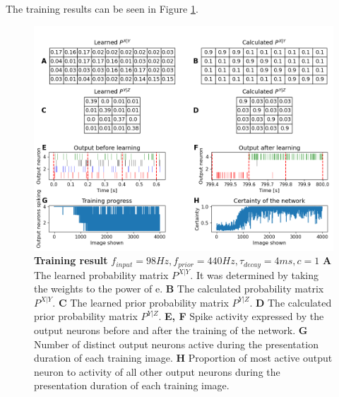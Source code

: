 The training results can be seen in Figure \ref{fig:1DTraining}. 
\begin{figure}
  \includegraphics[width=\linewidth]{figures/1D/training/trainingPlot_98_440_4.png}
  \caption{\textbf{Training result} $f_{input} = 98 Hz, f_{prior} = 440 Hz, \tau_{decay} = 4 ms, c = 1$ \textbf{A} The learned probability matrix $P^{X|Y}$. It was determined by taking the weights to the power of e. \textbf{B} The calculated probability matrix $P^{X|Y}$. \textbf{C} The learned prior probability matrix $P^{Y|Z}$. \textbf{D} The calculated prior probability matrix $P^{Y|Z}$. \textbf{E, F} Spike activity expressed by the output neurons before and after the training of the network. \textbf{G} Number of distinct output neurons active during the presentation duration of each training image. \textbf{H} Proportion of most active output neuron  to activity of all other output neurons during the presentation duration of each training image.}
  \label{fig:1DTraining}
\end{figure}


